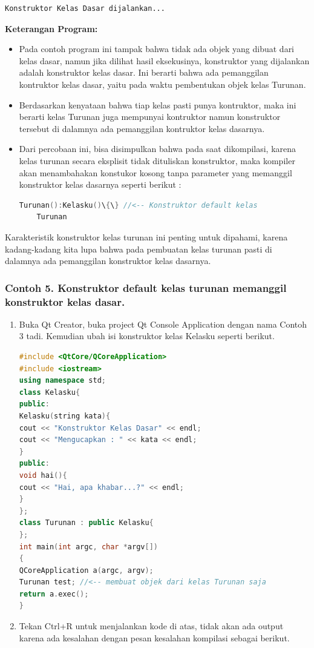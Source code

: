 \begin{verbatim}
Konstruktor Kelas Dasar dijalankan...
\end{verbatim}


\textbf{Keterangan Program:}

\begin{itemize}
\item
  Pada contoh program ini tampak bahwa tidak ada objek yang dibuat dari
  kelas dasar, namun jika dilihat hasil eksekusinya, konstruktor yang
  dijalankan adalah konstruktor kelas dasar. Ini berarti bahwa ada
  pemanggilan kontruktor kelas dasar, yaitu pada waktu pembentukan objek
  kelas Turunan.
\item
  Berdasarkan kenyataan bahwa tiap kelas pasti punya kontruktor, maka
  ini berarti kelas Turunan juga mempunyai kontruktor namun konstruktor
  tersebut di dalamnya ada pemanggilan kontruktor kelas dasarnya.
\item
  Dari percobaan ini, bisa disimpulkan bahwa pada saat dikompilasi,
  karena kelas turunan secara eksplisit tidak dituliskan konstruktor,
  maka kompiler akan menambahakan konstukor kosong tanpa parameter yang
  memanggil konstruktor kelas dasarnya seperti berikut :

\begin{lstlisting}[language=c++]
	Turunan():Kelasku()\{\} //<-- Konstruktor default kelas
	Turunan
\end{lstlisting}
  
\end{itemize}

Karakteristik konstruktor kelas turunan ini penting untuk dipahami,
karena kadang-kadang kita lupa bahwa pada pembuatan kelas turunan pasti
di dalamnya ada pemanggilan konstruktor kelas dasarnya.

\subsubsection*{Contoh 5. Konstruktor default kelas turunan memanggil konstruktor kelas
dasar.}

\begin{enumerate}
\def\labelenumi{\arabic{enumi}.}
\item
  Buka Qt Creator, buka project Qt Console Application dengan nama
  Contoh 3 tadi. Kemudian ubah isi konstruktor kelas Kelasku seperti
  berikut.

\begin{lstlisting}[language=c++]
#include <QtCore/QCoreApplication>
#include <iostream>
using namespace std;
class Kelasku{
public:
Kelasku(string kata){
cout << "Konstruktor Kelas Dasar" << endl;
cout << "Mengucapkan : " << kata << endl;
}
public:
void hai(){
cout << "Hai, apa khabar...?" << endl;
}
};
class Turunan : public Kelasku{
};
int main(int argc, char *argv[])
{
QCoreApplication a(argc, argv);
Turunan test; //<-- membuat objek dari kelas Turunan saja
return a.exec();
}
\end{lstlisting}
\item
  Tekan Ctrl+R untuk menjalankan kode di atas, tidak akan ada output
  karena ada kesalahan dengan pesan kesalahan kompilasi sebagai berikut.
\end{enumerate}

